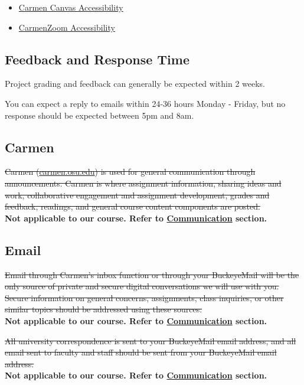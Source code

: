 \begin{itemize}
      \tightlist
      \item \href{https://community.canvaslms.com/docs/DOC-2061}{Carmen Canvas Accessibility}
      \item \href{https://go.osu.edu/Bqd4}{CarmenZoom Accessibility}
\end{itemize}

\subsection{Feedback and Response Time}

Project grading and feedback can generally be expected within 2 weeks.

You can expect a reply to emails within 24-36 hours Monday - Friday, but no response should be expected between 5pm and 8am.

\subsection{Carmen}

\sout{Carmen (\href{http://carmen.osu.edu/}{carmen.osu.edu}) is used for general communication through announcements. Carmen is where assignment information, sharing ideas and work, collaborative engagement and assignment development, grades and feedback, readings, and general course content components are posted.}\\
\textbf{Not applicable to our course. Refer to \hyperlink{communication}{Communication} section.}

\subsection{Email}

\sout{Email through Carmen's inbox function or through your BuckeyeMail will be the only source of private and secure digital conversations we will use with you. Secure information on general concerns, assignments, class inquiries, or other similar topics should be addressed using these sources.}\\
\textbf{Not applicable to our course. Refer to \hyperlink{communication}{Communication} section.}

\sout{All university correspondence is sent to your BuckeyeMail email address, and all email sent to faculty and staff should be sent from your BuckeyeMail email address.}\\
\textbf{Not applicable to our course. Refer to \hyperlink{communication}{Communication} section.}

